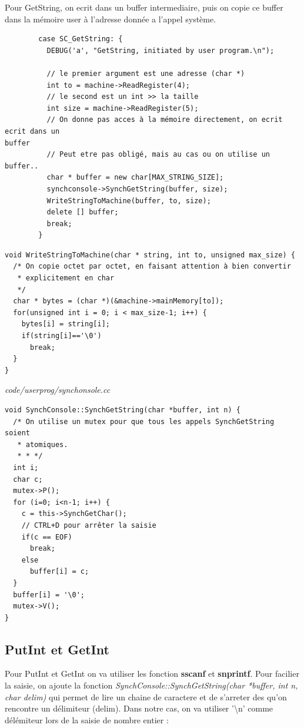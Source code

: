 \documentclass[a4paper,10pt]{article}
\begin{document}
Pour GetString, on ecrit dans un buffer intermediaire, puis on copie ce buffer
dans la mémoire user à l'adresse donnée a l'appel système.

\begin{lstlisting}
        case SC_GetString: {
          DEBUG('a', "GetString, initiated by user program.\n");

          // le premier argument est une adresse (char *)
          int to = machine->ReadRegister(4);
          // le second est un int >> la taille
          int size = machine->ReadRegister(5);
          // On donne pas acces à la mémoire directement, on ecrit ecrit dans un
buffer
          // Peut etre pas obligé, mais au cas ou on utilise un buffer..
          char * buffer = new char[MAX_STRING_SIZE];
          synchconsole->SynchGetString(buffer, size);
          WriteStringToMachine(buffer, to, size);
          delete [] buffer;
          break;
        }
\end{lstlisting}


\begin{lstlisting}
void WriteStringToMachine(char * string, int to, unsigned max_size) {
  /* On copie octet par octet, en faisant attention à bien convertir
   * explicitement en char
   */
  char * bytes = (char *)(&machine->mainMemory[to]);
  for(unsigned int i = 0; i < max_size-1; i++) {
    bytes[i] = string[i];
    if(string[i]=='\0')
      break;
  }
}
\end{lstlisting}

\textit{code/userprog/synchonsole.cc}
\begin{lstlisting}
void SynchConsole::SynchGetString(char *buffer, int n) {
  /* On utilise un mutex pour que tous les appels SynchGetString soient
   * atomiques.
   * * */
  int i;
  char c;
  mutex->P();
  for (i=0; i<n-1; i++) {
    c = this->SynchGetChar();
    // CTRL+D pour arrêter la saisie
    if(c == EOF)
      break;
    else
      buffer[i] = c;
  }
  buffer[i] = '\0';
  mutex->V();
}
\end{lstlisting}

\subsection{PutInt et GetInt}

Pour PutInt et GetInt on va utiliser les fonction \textbf{sscanf} et
\textbf{snprintf}. Pour facilier la saisie, on ajoute la fonction
\textit{SynchConsole::SynchGetString(char *buffer, int n, char delim)} qui
permet de lire un chaine de caractere et de s'arreter des qu'on rencontre un
délimiteur (delim). Dans notre cas, on va utiliser '\textbackslash{n}'
comme délémiteur lors de la saisie de nombre entier :
\end{document}
